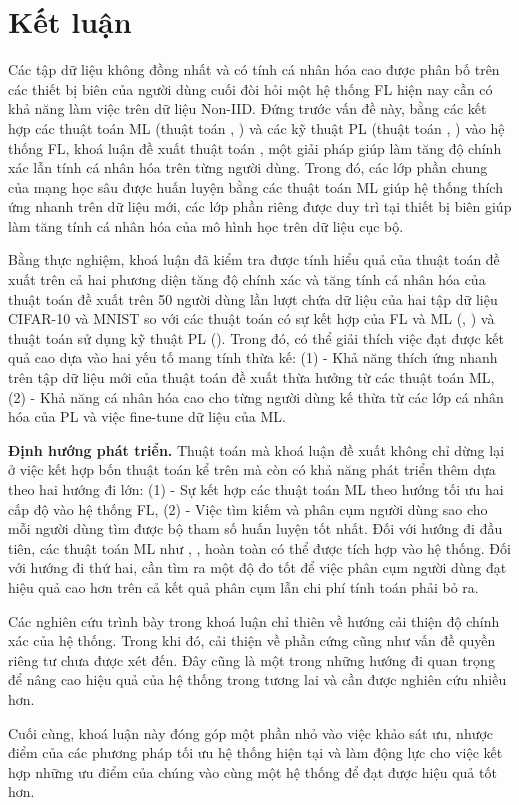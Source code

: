 \chapter{Kết luận}
\label{Chapter6}

Các tập dữ liệu không đồng nhất và có tính cá nhân hóa cao được phân bố trên các thiết bị biên của người dùng cuối đòi hỏi một hệ thống FL hiện nay cần có khả năng làm việc trên dữ liệu Non-IID. Đứng trước vấn đề này, bằng các kết hợp các thuật toán ML (thuật toán , ) và các kỹ thuật PL (thuật toán , ) vào hệ thống FL, khoá luận đề xuất thuật toán , một giải pháp giúp làm tăng độ chính xác lẫn tính cá nhân hóa trên từng người dùng. Trong đó, các lớp phần chung của mạng học sâu được huấn luyện bằng các thuật toán ML giúp hệ thống thích ứng nhanh trên dữ liệu mới, các lớp phần riêng được duy trì tại thiết bị biên giúp làm tăng tính cá nhân hóa của mô hình học trên dữ liệu cục bộ.

Bằng thực nghiệm, khoá luận đã kiểm tra được tính hiểu quả của thuật toán đề xuất trên cả hai phương diện tăng độ chính xác và tăng tính cá nhân hóa của thuật toán đề xuất trên 50 người dùng lần lượt chứa dữ liệu của hai tập dữ liệu CIFAR-10 và MNIST so với các thuật toán có sự kết hợp của FL và ML (, ) và thuật toán sử dụng kỹ thuật PL (). Trong đó, có thể giải thích việc đạt được kết quả cao dựa vào hai yếu tố mang tính thừa kế: (1) - Khả năng thích ứng nhanh trên tập dữ liệu mới của thuật toán đề xuất thừa hưởng từ các thuật toán ML, (2) - Khả năng cá nhân hóa cao cho từng người dùng kế thừa từ các lớp cá nhân hóa của PL và việc fine-tune dữ liệu của ML.

\textbf{Định hướng phát triển.} Thuật toán mà khoá luận đề xuất không chỉ dừng lại ở việc kết hợp bốn thuật toán kể trên mà còn có khả năng phát triển thêm dựa theo hai hướng đi lớn: (1) - Sự kết hợp các thuật toán ML theo hướng tối ưu hai cấp độ vào hệ thống FL, (2) - Việc tìm kiếm và phân cụm người dùng sao cho mỗi người dùng tìm được bộ tham số huấn luyện tốt nhất. Đối với hướng đi đầu tiên, các thuật toán ML như  \cite{finn2017model},  \cite{nichol2018first},  \cite{rajeswaran2019meta} hoàn toàn có thể được tích hợp vào hệ thống. Đối với hướng đi thứ hai, cần tìm ra một độ đo tốt để việc phân cụm người dùng đạt hiệu quả cao hơn trên cả kết quả phân cụm lẫn chi phí tính toán phải bỏ ra.

Các nghiên cứu trình bày trong khoá luận chỉ thiên về hướng cải thiện độ chính xác của hệ thống. Trong khi đó, cải thiện về phần cứng cũng như vấn đề quyền riêng tư chưa được xét đến. Đây cũng là một trong những hướng đi quan trọng để nâng cao hiệu quả của hệ thống trong tương lai và cần được nghiên cứu nhiều hơn.

Cuối cùng, khoá luận này đóng góp một phần nhỏ vào việc khảo sát ưu, nhược điểm của các phương pháp tối ưu hệ thống hiện tại và làm động lực cho việc kết hợp những ưu điểm của chúng vào cùng một hệ thống để đạt được hiệu quả tốt hơn.
